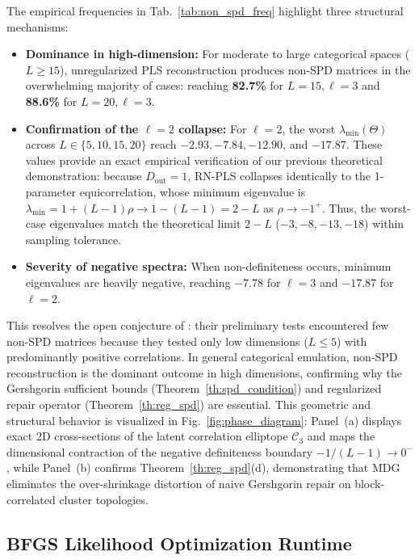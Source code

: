 \documentclass[default,sn-mathphys,Numbered]{sn-jnl}
\theoremstyle{thmstyleone}
\theoremstyle{thmstylethree}
\theoremstyle{thmstyletwo}
\newcommand{\outp}{\text{out}}
\begin{document}
The empirical frequencies in Tab.~\ref{tab:non_spd_freq} highlight three structural mechanisms:
\begin{itemize}
    \item \textbf{Dominance in high-dimension:} For moderate to large categorical spaces ($L \ge 15$), unregularized PLS reconstruction produces non-SPD matrices in the overwhelming majority of cases: reaching \textbf{82.7\%} for $L=15, \ell=3$ and \textbf{88.6\%} for $L=20, \ell=3$.
    \item \textbf{Confirmation of the $\ell=2$ collapse:} For $\ell=2$, the worst $\lambda_{\min}(\Theta)$ across $L \in \{5, 10, 15, 20\}$ reach $-2.93, -7.84, -12.90$, and $-17.87$. These values provide an exact empirical verification of our previous theoretical demonstration: because $D_{\outp}=1$, RN-PLS collapses identically to the 1-parameter equicorrelation, whose minimum eigenvalue is $\lambda_{\min} = 1 + (L-1)\rho \to 1 - (L-1) = 2 - L$ as $\rho \to -1^+$. Thus, the worst-case eigenvalues match the theoretical limit $2 - L$ ($-3, -8, -13, -18$) within sampling tolerance.
    \item \textbf{Severity of negative spectra:} When non-definiteness occurs, minimum eigenvalues are heavily negative, reaching $-7.78$ for $\ell=3$ and $-17.87$ for $\ell=2$.
\end{itemize}
This resolves the open conjecture of \citet[Section~3.2]{saves2023high}: their preliminary tests encountered few non-SPD matrices because they tested only low dimensions ($L \le 5$) with predominantly positive correlations. In general categorical emulation, non-SPD reconstruction is the dominant outcome in high dimensions, confirming why the Gershgorin sufficient bounds (Theorem~\ref{th:spd_condition}) and regularized repair operator (Theorem~\ref{th:reg_spd}) are essential. This geometric and structural behavior is visualized in Fig.~\ref{fig:phase_diagram}: Panel~(a) displays exact 2D cross-sections of the latent correlation elliptope $\mathcal{C}_3$ and maps the dimensional contraction of the negative definiteness boundary $-1/(L-1) \to 0^-$, while Panel~(b) confirms Theorem~\ref{th:reg_spd}(d), demonstrating that MDG eliminates the over-shrinkage distortion of naive Gershgorin repair on block-correlated cluster topologies.

\subsection{BFGS Likelihood Optimization Runtime}
\label{subsec:mle_optimization}
\end{document}
